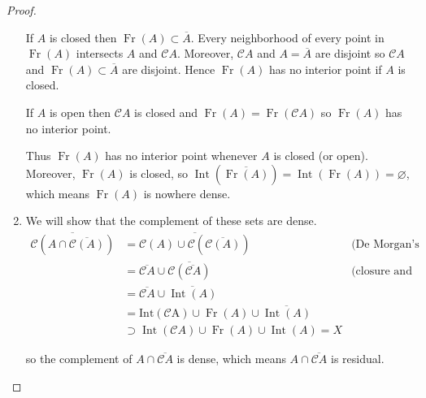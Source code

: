 \begin{proof}
\begin{enumerate}[label={(\arabic*)},itemsep=0pt,leftmargin=*]
		      If \(A\) is closed then \( \operatorname{Fr}(A) \subset \overline{A} \). Every neighborhood of every point in \( \operatorname{Fr}(A) \) intersects \(A\) and \(\mathscr{C}A\). Moreover, \( \mathscr{C}A \) and \( A = \overline{A} \) are disjoint so \( \mathscr{C}A \) and \( \operatorname{Fr}(A) \subset \overline{A} \) are disjoint. Hence \( \operatorname{Fr}(A) \) has no interior point if \(A\) is closed.

		      If \(A\) is open then \(\mathscr{C}A\) is closed and \(\operatorname{Fr}(A) = \operatorname{Fr}(\mathscr{C}A)\) so \( \operatorname{Fr}(A) \) has no interior point.

		      Thus \( \operatorname{Fr}(A) \) has no interior point whenever \(A\) is closed (or open). Moreover, \( \operatorname{Fr}(A) \) is closed, so \( \operatorname{Int}(\overline{\operatorname{Fr}(A)}) = \operatorname{Int}(\operatorname{Fr}(A)) = \varnothing \), which means \( \operatorname{Fr}(A) \) is nowhere dense.
		\item We will show that the complement of these sets are dense.
		      \begingroup
		      \allowdisplaybreaks%
		      \begin{align*}
			      \overline{\mathscr{C}(A \cap \overline{\mathscr{C}(A)})} & = \overline{\mathscr{C}(A) \cup \mathscr{C}(\overline{\mathscr{C}(A)})}                            & \text{(De Morgan's law)}                   \\
			                                                               & = \overline{\mathscr{C}A} \cup \overline{\mathscr{C}(\overline{\mathscr{C}A})}                     & \text{(closure and union are commutative)} \\
			                                                               & = \overline{\mathscr{C}A} \cup \overline{\operatorname{Int}(A)}                                                                                 \\
			                                                               & = \operatorname{Int(\mathscr{C}A)} \cup \operatorname{Fr}(A) \cup \overline{\operatorname{Int}(A)}                                              \\
			                                                               & \supset \operatorname{Int}(\mathscr{C}A) \cup \operatorname{Fr}(A) \cup \operatorname{Int}(A) = X
		      \end{align*}
		      \endgroup

		      so the complement of \( A \cap \overline{\mathscr{C}A} \) is dense, which means \( A \cap \overline{\mathscr{C}A} \) is residual.


\end{enumerate}
\end{proof}
